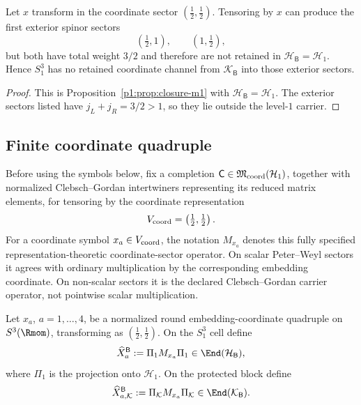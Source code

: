 \documentclass[11pt]{article}
\begin{document}
\begin{theorem}[Retained coordinate channels at \texorpdfstring{\(m=1\)}{m=1}]
\label{p1:thm:s3one-coordinate-closure}
Let \(x\) transform in the coordinate sector \((\tfrac12,\tfrac12)\). Tensoring by \(x\) can produce the first exterior spinor sectors
\[
    (\tfrac12,1),
    \qquad
    (1,\tfrac12),
\]
but both have total weight \(3/2\) and therefore are not retained in \(\mathcal H_{\mathsf B}=\mathcal H_1\).  Hence \(S^3_1\) has no retained coordinate channel from \(\mathcal K_{\mathsf B}\) into those exterior sectors.
\end{theorem}

\begin{proof}
This is Proposition~\ref{p1:prop:closure-m1} with \(\mathcal H_{\mathsf B}=\mathcal H_1\).  The exterior sectors listed have \(j_L+j_R=3/2>1\), so they lie outside the level-\(1\) carrier.
\end{proof}

\subsection{Finite coordinate quadruple}
Before using the symbols below, fix a completion
\(\mathsf C\in\mathfrak M_{\rm coord}(\mathcal H_1)\), together with
normalized Clebsch--Gordan intertwiners representing its reduced matrix
elements, for
tensoring by the coordinate representation
\[
V_{\rm coord}=\left(\tfrac12,\tfrac12\right).
\]
For a coordinate symbol \(x_a\in V_{\rm coord}\), the notation \(M_{x_a}\)
denotes this fully specified representation-theoretic coordinate-sector
operator.  On scalar Peter--Weyl sectors it agrees with ordinary multiplication
by the corresponding embedding coordinate.  On non-scalar sectors it is the
declared Clebsch--Gordan carrier operator, not pointwise scalar multiplication.

\begin{definition}
\label{p1:def:s3one-toeplitz-coordinates}
Let \(x_a\), \(a=1,\ldots,4\), be a normalized round embedding-coordinate
quadruple on \(S^3(\Rmom)\), transforming as \((\tfrac12,\tfrac12)\).  On the
\(S^3_1\) cell define
\[
    \widehat X_a^{\mathsf B}:=\Pi_1 M_{x_a}\Pi_1
    \in \End(\mathcal H_{\mathsf B}),
\]
where \(\Pi_1\) is the projection onto \(\mathcal H_1\).  On the protected block define
\[
    \widehat X_{a,\mathcal K}^{\mathsf B}
    :=
    \Pi_{\mathcal K}M_{x_a}\Pi_{\mathcal K}
    \in \End(\mathcal K_{\mathsf B}).
\]
\end{definition}
\end{document}
